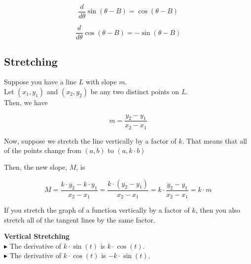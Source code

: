 \documentclass{ximera}
\begin{document}
\begin{notation}

\[
\frac{d}{d\theta} \sin(\theta - B) = \cos(\theta - B)
\]

\[
\frac{d}{d\theta} \cos(\theta - B) = -\sin(\theta - B)
\]

\end{notation}













\subsection*{Stretching}


Suppose you have a line $L$ with slope $m$. \\

Let $(x_1, y_1)$ and $(x_2, y_2)$ be any two distinct points on $L$. \\

Then, we have


\[
m = \frac{y_2 - y_1}{x_2 - x_1}
\]






Now, suppose we stretch the line vertically by a factor of $k$.  That means that all of the points change from $(a, b)$ to $(a, k \cdot b)$

Then, the new slope, $M$, is 



\[
M = \frac{k \cdot y_2 - k \cdot y_1}{x_2 - x_1} = \frac{k \cdot (y_2 - y_1)}{x_2 - x_1} = k \cdot \frac{y_2 - y_1}{x_2 - x_1} = k \cdot m
\]


If you stretch the graph of a function vertically by a factor of $k$, then you also stretch all of the tangent lines by the same factor.


\begin{observation} \textbf{\textcolor{purple!85!blue}{Vertical Stretching}}   \\

$\blacktriangleright$ The derivative of $k \cdot \sin(t)$ is $k \cdot \cos(t)$. \\

$\blacktriangleright$ The derivative of $k \cdot \cos(t)$ is $-k \cdot \sin(t)$. \\

\end{observation}
\end{document}
